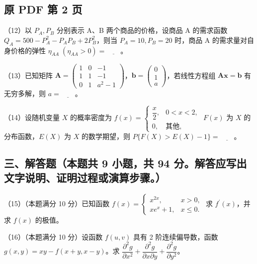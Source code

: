 \documentclass[UTF8,12pt]{ctexart}
\begin{document}
\clearpage

\subsection*{原 PDF 第 2 页}

（12）以 \(\displaystyle P_A,\allowbreak P_B\) 分别表示 A、B 两个商品的价格，设商品 A 的需求函数 \(\displaystyle Q_A=500-P_A^2-P_AP_B+2P_B^2\)，则当 \(\displaystyle P_A=10,\allowbreak P_B=20\) 时，商品 A 的需求量对自身价格的弹性 \(\displaystyle \eta_{AA}\;(\eta_{AA}>0)=\underline{\qquad}\)。


（13）已知矩阵 \(\displaystyle \boldsymbol A=\begin{pmatrix}1&0&-1\\1&1&-1\\0&1&a^2-1\end{pmatrix}\)，\(\displaystyle \boldsymbol b=\begin{pmatrix}0\\1\\a\end{pmatrix}\)，若线性方程组 \(\displaystyle \boldsymbol A\boldsymbol x=\boldsymbol b\) 有无穷多解，则 \(\displaystyle a=\underline{\qquad}\)。


（14）设随机变量 \(\displaystyle X\) 的概率密度为 \(\displaystyle f(x)=\begin{cases}\dfrac{\displaystyle x}{\displaystyle 2},\allowbreak &0<x<2,\allowbreak \\0,\allowbreak &\text{其他},\allowbreak \end{cases}\) \(\displaystyle F(x)\) 为 \(\displaystyle X\) 的分布函数，\(\displaystyle E(X)\) 为 \(\displaystyle X\) 的数学期望，则 \(\displaystyle P\{F(X)>E(X)-1\}=\underline{\qquad}\)。


\subsection*{三、解答题（本题共 9 小题，共 94 分。解答应写出文字说明、证明过程或演算步骤。）}

（15）（本题满分 10 分）已知函数 \(\displaystyle f(x)=\begin{cases}x^{2x},\allowbreak &x>0,\allowbreak \\xe^x+1,\allowbreak &x\leq0.\end{cases}\) 求 \(\displaystyle f^\prime(x)\)，并求 \(\displaystyle f(x)\) 的极值。


（16）（本题满分 10 分）设函数 \(\displaystyle f(u,\allowbreak v)\) 具有 2 阶连续偏导数，函数 \(\displaystyle g(x,\allowbreak y)=xy-f(x+y,\allowbreak x-y)\)。求 \(\displaystyle \dfrac{\displaystyle \partial^2g}{\displaystyle \partial x^2}+\dfrac{\displaystyle \partial^2g}{\displaystyle \partial x\partial y}+\dfrac{\displaystyle \partial^2g}{\displaystyle \partial y^2}\)。
\end{document}
